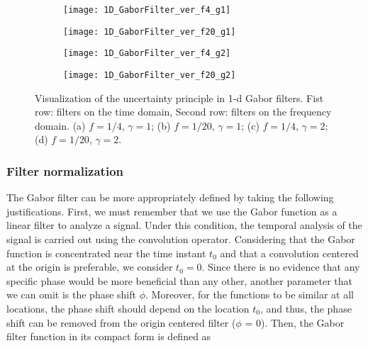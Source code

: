 \begin{figure}[!ht] 
	\centering
	\begin{subfigure}[b]{0.23\textwidth}
		\centering
		\texttt{[image: 1D\_GaborFilter\_ver\_f4\_g1]}
		\caption{}
		\label{fig:1D_GaborFilter_f4_g1}
	\end{subfigure}
	\begin{subfigure}[b]{0.23\textwidth}
		\centering
		\texttt{[image: 1D\_GaborFilter\_ver\_f20\_g1]}
		\caption{}
		\label{fig:1D_GaborFilter_f20_g1}
	\end{subfigure}
	\begin{subfigure}[b]{0.23\textwidth}
		\centering
		\texttt{[image: 1D\_GaborFilter\_ver\_f4\_g2]}
		\caption{}
		\label{fig:1D_GaborFilter_f4_g2}
	\end{subfigure}
	\begin{subfigure}[b]{0.23\textwidth}
		\centering
		\texttt{[image: 1D\_GaborFilter\_ver\_f20\_g2]}
		\caption{}
		\label{fig:1D_GaborFilter_f20_g2}
	\end{subfigure}
		

  \caption{Visualization of the uncertainty principle in 1-d Gabor filters. Fist row: filters on the time domain, Second row: filters on the frequency domain. (a) $f = 1/4$, $\gamma = 1$; (b) $f = 1/20$, $\gamma = 1$; (c) $f = 1/4$, $\gamma = 2$; (d) $f = 1/20$, $\gamma = 2$.}
  \label{fig:examples_1D_GaborFilter}
\end{figure}

\subsubsection{Filter normalization} \label{subsec:filter_normalization}
The Gabor filter can be more appropriately defined by taking the following justifications. First, we must remember that we use the Gabor function as a linear filter to analyze a signal. Under this condition, the temporal analysis of the signal is carried out using the convolution operator. Considering that the Gabor function is concentrated near the time instant $t_0$ and that a convolution centered at the origin is preferable, we consider $t_0 = 0$. Since there is no evidence that any specific phase would be more beneficial than any other, another parameter that we can omit is the phase shift $\phi$. Moreover, for the functions to be similar at all locations, the phase shift should depend on the location $t_0$, and thus, the phase shift can be removed from the origin centered filter ($\phi$ = 0). Then, the Gabor filter function in its compact form is defined as 

